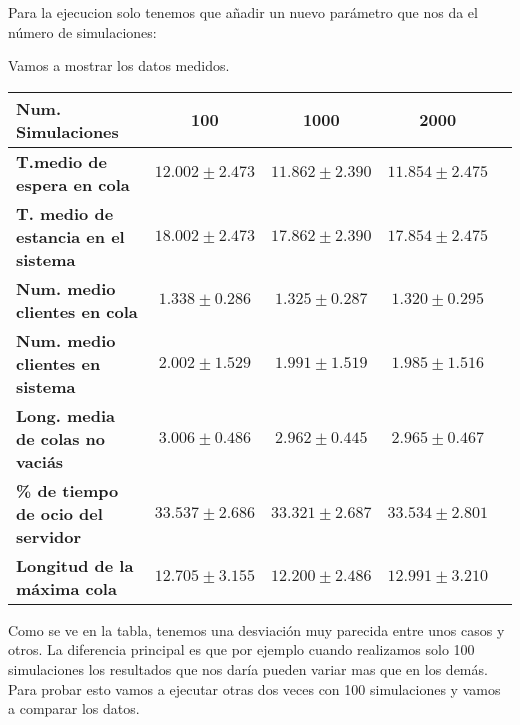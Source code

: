 \documentclass[]{article}
\begin{document}
Para la ejecucion solo tenemos que añadir un nuevo parámetro que nos da el número de simulaciones:

\scalebox{0.8}{%
$./colammk <numeroServidores> <tiempoParada> <tlleg> <tserv> <numRepeticiones>$}
\newline
Vamos a mostrar los datos medidos.
\begin{table}[H]
	\begin{center}
		\begin{tabularx}{1\textwidth}{|X|c|c|c|c|}
			\hline
			\textbf{Num. Simulaciones} &  100 & 1000 & 2000\\
			\hline \hline
			\textbf{T.medio de espera en cola}& $12.002\pm2.473$ & $11.862\pm2.390$ & $11.854\pm2.475$ \\ \hline
			\textbf{T. medio de estancia en el sistema}& $18.002\pm2.473$ & $17.862\pm2.390$ & $17.854\pm2.475$ \\ \hline
			\textbf{Num. medio clientes en cola}& $1.338\pm0.286$ & $1.325\pm0.287$& $1.320\pm0.295$ \\  \hline
			\textbf{Num. medio clientes en sistema}& $2.002\pm1.529$ & $1.991\pm1.519$& $1.985\pm1.516$ \\ \hline
			\textbf{Long. media de colas no vaciás}& $3.006\pm0.486$ & $2.962\pm0.445$& $2.965\pm0.467$ \\ \hline
			\textbf{\% de tiempo de ocio del servidor}& $33.537\pm2.686$ & $33.321\pm2.687$& $33.534\pm2.801$ \\ \hline
			\textbf{Longitud de la máxima cola}& $12.705\pm3.155$  &$12.200\pm2.486$& $12.991\pm3.210$ \\ \hline
		\end{tabularx}
		
	\end{center}
\end{table}
Como se ve en la tabla, tenemos una desviación muy parecida entre unos casos y otros. La diferencia principal es que por ejemplo cuando realizamos solo 100 simulaciones los resultados que nos daría pueden variar mas que en los demás. Para probar esto vamos a ejecutar otras dos veces con 100 simulaciones y vamos a comparar los datos.
\end{document}
